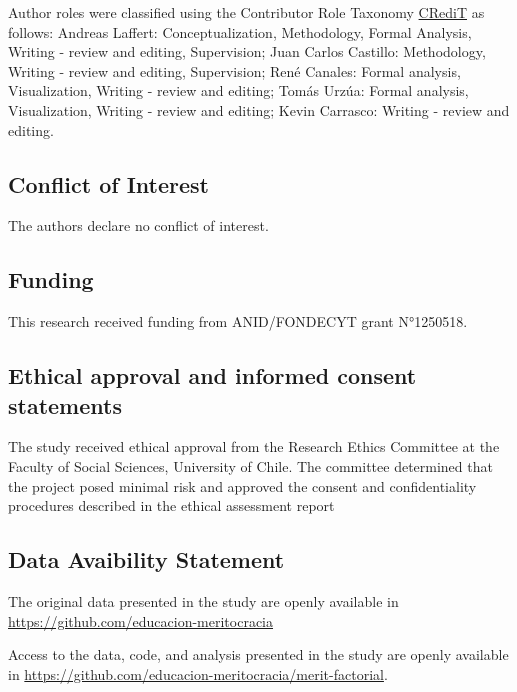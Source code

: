 \documentclass[
  12pt,
  letterpaper,
  DIV=11,
  numbers=noendperiod]{scrartcl}
\begin{document}
Author roles were classified using the Contributor Role Taxonomy
\href{https://credit.niso.org/}{CRediT} as follows: Andreas Laffert:
Conceptualization, Methodology, Formal Analysis, Writing - review and
editing, Supervision; Juan Carlos Castillo: Methodology, Writing -
review and editing, Supervision; René Canales: Formal analysis,
Visualization, Writing - review and editing; Tomás Urzúa: Formal
analysis, Visualization, Writing - review and editing; Kevin Carrasco:
Writing - review and editing.

\subsection{Conflict of Interest}\label{conflict-of-interest}

The authors declare no conflict of interest.

\subsection{Funding}\label{funding}

This research received funding from ANID/FONDECYT grant N°1250518.

\subsection{Ethical approval and informed consent
statements}\label{ethical-approval-and-informed-consent-statements}

The study received ethical approval from the Research Ethics Committee
at the Faculty of Social Sciences, University of Chile. The committee
determined that the project posed minimal risk and approved the consent
and confidentiality procedures described in the ethical assessment
report

\subsection{Data Avaibility Statement}\label{data-avaibility-statement}

The original data presented in the study are openly available in
\url{https://github.com/educacion-meritocracia}

Access to the data, code, and analysis presented in the study are openly
available in
\url{https://github.com/educacion-meritocracia/merit-factorial}.
\end{document}
